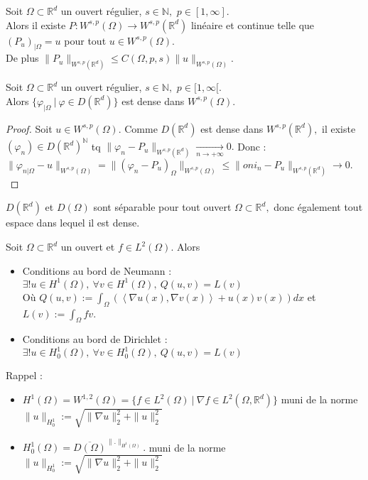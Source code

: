 \begin{theoreme}
    Soit $\Omega\subset \mathbb{R} ^d$ un ouvert régulier, $s\in \mathbb{N} ,$ $p\in [1,\infty ].$ \\
    Alors il existe $P:W^{s,p}(\Omega)\to W^{s,p}(\mathbb{R} ^d)$ linéaire et  continue telle que $\left( P_u \right) _{|\Omega}=u$ pour tout $u\in W^{s,p}(\Omega).$ \\
    De plus $\|P_u\|_{W^{s,p}(\mathbb{R} ^d)}\le C(\Omega,p,s)\|u\|_{W^{s,p}(\Omega)}.$
\end{theoreme}
\begin{corollaire}
    Soit $\Omega\subset \mathbb{R} ^d$ un ouvert régulier, $s\in \mathbb{N} ,$ $p\in [1,\infty [.$ \\
    Alors $\{\varphi _{|\Omega}\ |\ \varphi \in D(\mathbb{R} ^d)\} $ est dense dans $W^{s,p}(\Omega).$
\end{corollaire}
\begin{proof}
    Soit $u\in W^{s,p}(\Omega).$ Comme $D(\mathbb{R} ^d)$ est dense dans $W^{s,p}(\mathbb{R} ^d),$ il existe $\left( \varphi _n \right) \in D(\mathbb{R} ^d)^\mathbb{N} $ tq $\|\varphi _n-P_u\|_{W^{s,p}(\mathbb{R} ^d)}\underset{n\to +\infty}{\longrightarrow} 0.$ Donc :\\
    $\|\varphi _{n|\Omega}-u\|_{W^{s,p}(\Omega)}=\|\left( \varphi _n-P_u \right) _{\Omega}\|_{W^{s,p}(\Omega)}\le \|oni_n-P_u\|_{W^{s,p}(\mathbb{R} ^d)}\to 0.$
\end{proof}
\begin{remarque}
    $D(\mathbb{R} ^d)$ et $D(\Omega)$ sont séparable pour tout ouvert $\Omega\subset \mathbb{R} ^d,$ donc également tout espace dans lequel il est dense.
\end{remarque}
\begin{theoreme}[Problème de Poisson, $\Delta u=f$]
    Soit $\Omega\subset \mathbb{R} ^d$ un ouvert et $f\in L^2(\Omega).$ Alors
    \begin{itemize}
        \item Conditions au bord de Neumann : \\
        $\exists !u\in H^1(\Omega),\ \forall v\in H^1(\Omega),\ Q(u,v)=L(v)$ \\
            Où $Q(u,v):=\int_\Omega\left( \left<\nabla u(x),\nabla v(x) \right>+u(x)v(x) \right) dx$ et $L(v):=\int_\Omega fv$.
        \item Conditions au bord de Dirichlet :\\
        $\exists !u\in H_0^1(\Omega),\ \forall v\in H_0^1(\Omega),\ Q(u,v)=L(v)$
    \end{itemize}
    Rappel :
    \begin{itemize}
        \item $H^1(\Omega)=W^{1,2}(\Omega)=\{f\in L^2(\Omega)\ |\ \nabla f\in L^2(\Omega,\mathbb{R} ^d)\} $ muni de la norme $\|u\|_{H^1_0}:=\sqrt{\|\nabla u\|^2_2+\|u\|_2^2}$
        \item $H_0^1(\Omega)=\overline{D(\Omega)}^{\|.\|_{H^1(\Omega)}}.$ muni de la norme $\|u\|_{H^1_0}:=\sqrt{\|\nabla u\|^2_2+\|u\|_2^2}$
    \end{itemize}
\end{theoreme}
